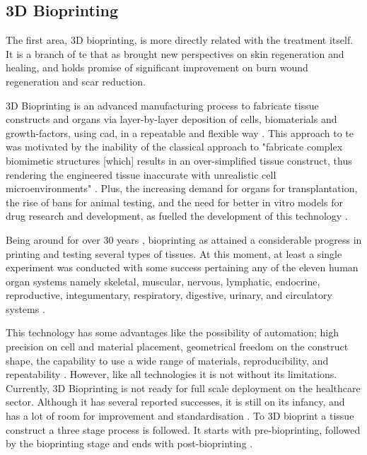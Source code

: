 \subsection{3D Bioprinting} %
\label{subsec:3D_bioprinting}

The first area, 3D bioprinting, is more directly related with the treatment itself. It is a branch of \gls{te} that as brought new perspectives on skin regeneration and healing, and holds promise of significant improvement on burn wound regeneration and scar reduction.

3D Bioprinting is an advanced manufacturing process to fabricate tissue constructs and organs via layer-by-layer deposition of cells, biomaterials and growth-factors, using \gls{cad}, in a repeatable and flexible way \cite{Ng2016_skin_bioprint_reality_fantasy}. This approach to \gls{te} was motivated by the inability of the classical approach to "fabricate complex biomimetic structures [which] results in an over-simplified tissue construct, thus rendering the engineered tissue inaccurate with unrealistic cell microenvironments" \cite{Vijayavenkataraman2018_bioprinting_tissues_organs_regen_med}. Plus, the increasing demand for organs for transplantation, the rise of bans for animal testing, and the need for better in vitro models for drug research and development, as fuelled the development of this technology \cite{Vijayavenkataraman2018_bioprinting_tissues_organs_regen_med}.

Being around for over 30 years \cite{Ozbolat2017_evaluation_bioprinter_tech}, bioprinting as attained a considerable progress in printing and testing several types of tissues. At this moment, at least a single experiment was conducted with some success pertaining any of the eleven human organ systems namely skeletal, muscular, nervous, lymphatic, endocrine, reproductive, integumentary, respiratory, digestive, urinary, and circulatory systems \cite{Vijayavenkataraman2018_bioprinting_tissues_organs_regen_med}.

This technology has some advantages like the possibility of automation; high precision on cell and material placement, geometrical freedom on the construct shape, the capability to use a wide range of materials, reproducibility, and repeatability \cite{Vijayavenkataraman2018_bioprinting_tissues_organs_regen_med}. However, like all technologies it is not without its limitations. Currently, 3D Bioprinting is not ready for full scale deployment on the healthcare sector. Although it has several reported successes, it is still on its infancy, and has a lot of room for improvement and standardisation \cite{Vijayavenkataraman2018_bioprinting_tissues_organs_regen_med, Datta2018_essential_steps_bioprinting}. To 3D bioprint a tissue construct a three stage process is followed. It starts with pre-bioprinting, followed by the bioprinting stage and ends with post-bioprinting \cite{Datta2018_essential_steps_bioprinting, Vijayavenkataraman2018_bioprinting_tissues_organs_regen_med}. 

